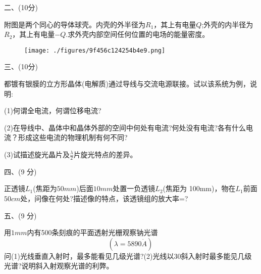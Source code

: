 二、(10分)

附图是两个同心的导体球壳。内壳的外半径为$R_1$，其上有电量$Q$;外壳的内半径为$R_2$，其上有电量$-Q$.求外壳内部空间任何位置的电场的能量密度。
\begin{figure}[ht]
\centering
\texttt{[image: ./figures/9f456c124254b4e9.png]}
\caption{} \label{fig_PKU199_4}
\end{figure}

三、(10分)

都镀有银膜的立方形晶体(电解质)通过导线与交流电源联接。试以该系统为例，说明:

(1)何谓全电流，何谓位移电流?

(2)在导线中、晶体中和晶体外部的空间中何处有电流?何处没有电流?各有什么电流？形成这些电流的物理机制有何不同?

(3)试描述旋光晶片及$\frac{\lambda}{2}$片旋光特点的差异。

四、(9 分)

正透镜$L_1$(焦距为$50mm$)后面$10mm$处置一负透镜$L_2$(焦距为 100mm)，物在$L_1$前面$50cm$处，问像在何处?描述像的特点，该透镜组的放大率=?

五、(9 分)

用$1mm$内有500条刻痕的平面透射光栅观察钠光谱$$\left( \lambda = 5890 \dot A \right)~$$
 问(1)光线垂直入射时，最多能看见几级光谱?(2)光线以30斜入射时最多能见几级光谱?说明斜入射观察光谱的利弊。